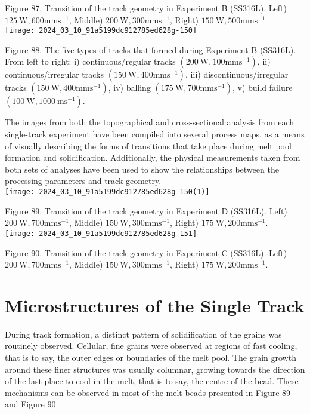 \documentclass[10pt]{article}
\begin{document}
Figure 87. Transition of the track geometry in Experiment B (SS316L). Left) $125 \mathrm{~W}, 600 \mathrm{mms}^{-1}$, Middle) $200 \mathrm{~W}, 300 \mathrm{mms}^{-1}$, Right) $150 \mathrm{~W}, 500 \mathrm{mms}^{-1}$\\
\texttt{[image: 2024\_03\_10\_91a5199dc912785ed628g-150]}

Figure 88. The five types of tracks that formed during Experiment B (SS316L). From left to right: i) continuous/regular tracks $\left(200 \mathrm{~W}, 100 \mathrm{mms}^{-1}\right)$, ii) continuous/irregular tracks $\left(150 \mathrm{~W}, 400 \mathrm{mms}^{-1}\right)$, iii) discontinuous/irregular tracks $\left(150 \mathrm{~W}, 400 \mathrm{mms}^{-1}\right)$, iv) balling $\left(175 \mathrm{~W}, 700 \mathrm{mms}^{-1}\right)$, v) build failure $\left(100 \mathrm{~W}, 1000 \mathrm{~ms}^{-1}\right)$.

The images from both the topographical and cross-sectional analysis from each single-track experiment have been compiled into several process maps, as a means of visually describing the forms of transitions that take place during melt pool formation and solidification. Additionally, the physical measurements taken from both sets of analyses have been used to show the relationships between the processing parameters and track geometry.\\
\texttt{[image: 2024\_03\_10\_91a5199dc912785ed628g-150(1)]}

Figure 89. Transition of the track geometry in Experiment D (SS316L). Left) $200 \mathrm{~W}, 700 \mathrm{mms}^{-1}$, Middle) $150 \mathrm{~W}, 300 \mathrm{mms}^{-1}$, Right) $175 \mathrm{~W}, 200 \mathrm{mms}^{-1}$.\\
\texttt{[image: 2024\_03\_10\_91a5199dc912785ed628g-151]}

Figure 90. Transition of the track geometry in Experiment C (SS316L). Left) $200 \mathrm{~W}, 700 \mathrm{mms}^{-1}$, Middle) $150 \mathrm{~W}, 300 \mathrm{mms}^{-1}$, Right) $175 \mathrm{~W}, 200 \mathrm{mms}^{-1}$.

\section*{Microstructures of the Single Track}
During track formation, a distinct pattern of solidification of the grains was routinely observed. Cellular, fine grains were observed at regions of fast cooling, that is to say, the outer edges or boundaries of the melt pool. The grain growth around these finer structures was usually columnar, growing towards the direction of the last place to cool in the melt, that is to say, the centre of the bead. These mechanisms can be observed in most of the melt beads presented in Figure 89 and Figure 90.
\end{document}
